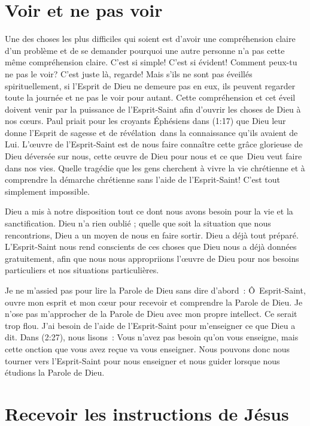\section{Voir et ne pas voir}

Une des choses les plus difficiles qui soient est d'avoir une compréhension
 claire d'un problème et de se demander pourquoi une autre personne
 n'a pas cette même compréhension claire. C'est si simple!
 C'est si évident! Comment peux-tu ne pas le voir?
 C'est juste là, regarde! Mais s'ils ne sont pas éveillés spirituellement,
 si l'Esprit de Dieu ne demeure pas en eux, ils peuvent regarder
 toute la journée et ne pas le voir pour autant.
 Cette compréhension et cet éveil doivent venir par la puissance
 de l'Esprit-Saint afin d'ouvrir les choses de Dieu à nos cœurs.
 Paul priait pour les croyants Éphésiens dans (1:17)
 que Dieu leur donne l'Esprit de sagesse et de révélation~dans la
 connaissance qu'ils avaient de Lui.
 L'œuvre de l'Esprit-Saint est de nous faire
 connaître cette grâce glorieuse de Dieu déversée sur nous,
 cette œuvre de Dieu pour nous et ce que~Dieu veut faire dans nos vies.
 Quelle tragédie que les gens cherchent à vivre la vie chrétienne
 et à comprendre la démarche chrétienne sans l'aide de l'Esprit-Saint!
 C'est tout simplement impossible.

Dieu a mis à notre disposition tout ce dont nous avons besoin pour la vie
 et la sanctification. Dieu n'a rien oublié ; quelle que soit la situation
 que nous rencontrions, Dieu a un moyen de nous en faire sortir.
 Dieu a déjà tout préparé. L'Esprit-Saint nous rend conscients
 de ces choses que Dieu nous a déjà données gratuitement,
 afin que nous nous appropriions l'œuvre de Dieu pour nos besoins
 particuliers et nos situations particulières.

Je ne m'assied pas pour lire la Parole de Dieu sans dire d'abord~: \linebreak
 \Og \^O~Esprit-Saint, ouvre mon esprit et mon cœur pour recevoir
 et comprendre la Parole de Dieu. \Fg{}
 Je n'ose pas m'approcher de la Parole de Dieu avec mon propre intellect.
 Ce serait trop flou. J'ai besoin de l'aide de l'Esprit-Saint
 pour m'enseigner ce que Dieu a dit.
 Dans (2:27), nous lisons~:
 \Og Vous n'avez pas besoin qu'on vous enseigne, mais cette onction
 que vous avez reçue va vous enseigner. \Fg{}
 Nous pouvons donc nous tourner vers l'Esprit-Saint
 pour nous enseigner et nous guider lorsque nous étudions
 la Parole de Dieu.
 \nowidow[3]


\section{Recevoir les instructions de J\'esus}

